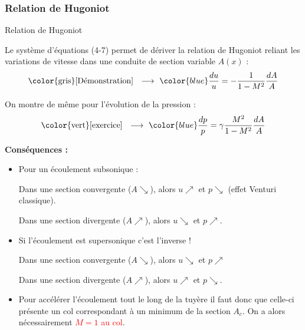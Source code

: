 \subsubsection{Relation de Hugoniot}
\begin{frame}{Relation de Hugoniot}

\small

Le système d'équations (4-7) permet de dériver la relation de \textcolor{vert}{Hugoniot}
reliant les variations de vitesse dans une conduite de section variable $A(x)$ :
\[
	\mbox{\color{gris} [Démonstration] \; $\longrightarrow$ \;}
	\color{blue}
	\frac{du}{u}  =  -\frac{1}{1-M^2} \frac{dA}{A}
\]

On montre de même pour l'évolution de la pression : 
\[
	\mbox{\color{vert} [exercice] \; $\longrightarrow$ \;}
	\color{blue}
	\frac{dp}{p} = \gamma \frac{M^2}{1-M^2} \frac{dA}{A} 
\]

\pause

\textbf{Conséquences :} %


\begin{itemize}
\item Pour un écoulement subsonique : 

Dans une section {\color{blue} convergente ($A \searrow $), alors $u \nearrow$} et $p \searrow$ (effet Venturi classique). 

Dans une section divergente ($A \nearrow $), alors $u \searrow$ et $p \nearrow$.
\pause
\medskip

\item Si l'écoulement est supersonique c'est l'inverse !

Dans une section convergente ($A \searrow $), alors $u \searrow$ et $p \nearrow$ 

Dans une section {\color{blue} divergente ($A \nearrow $), alors $u \nearrow$} et $p \searrow$.

\pause 
\medskip

\item Pour accélérer l'écoulement tout le long de la tuyère il faut donc que celle-ci présente un {\color{blue} col} correspondant à un minimum de la section $A_c$. On a alors nécessairement \textcolor{red}{$M=1$ au col}.%


\end{itemize}
\end{frame}
